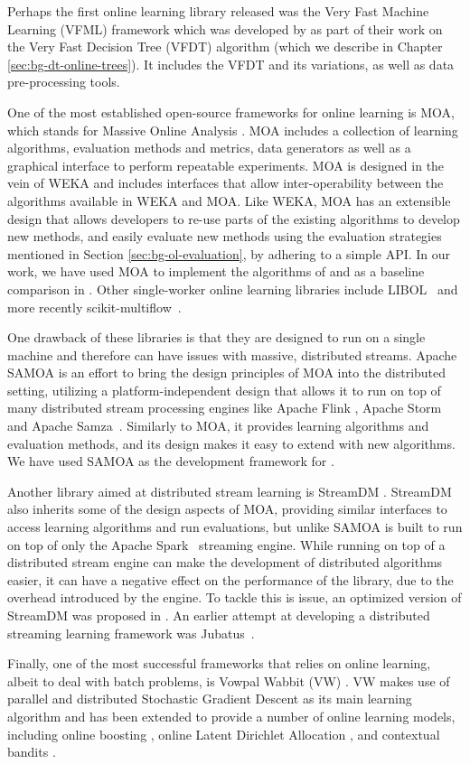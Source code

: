 Perhaps the first online learning library released was the Very Fast Machine Learning (VFML) framework which was developed by \citet{vfdt} as part of their work on the Very Fast Decision Tree (VFDT) algorithm (which we describe in Chapter \ref{sec:bg-dt-online-trees}).
It includes the VFDT and its variations, as well as data pre-processing tools.

One of the most established open-source frameworks for online learning is MOA, which stands
for Massive Online Analysis \cite{bifet2010moa}. MOA includes a collection of
learning algorithms, evaluation methods and metrics, data generators as well as
a graphical interface to perform repeatable experiments. MOA is designed in the
vein of WEKA \cite{weka} and includes interfaces that allow inter-operability
between the algorithms available in WEKA and MOA. Like WEKA, MOA has an extensible
design that allows developers to re-use parts of the existing algorithms to develop
new methods, and easily evaluate new methods using the evaluation strategies mentioned
in Section \ref{sec:bg-ol-evaluation}, by adhering to a simple API. In our work,
we have used MOA to implement the algorithms of \uncertaintrees and as a baseline comparison
in \boostvht. Other single-worker online learning libraries
include LIBOL~\cite{libol} and more recently scikit-multiflow~\cite{sk-multiflow}.

One drawback of these libraries is that they are designed to run on a single machine and therefore
can have issues with massive, distributed streams. Apache SAMOA \cite{samoa} is an effort
to bring the design principles of MOA into the distributed setting, utilizing a platform-independent
design that allows it to run on top of many distributed stream processing engines like
Apache Flink \cite{flink}, Apache Storm~\cite{storm} and Apache Samza~\cite{samza}.
Similarly to MOA, it provides learning algorithms and evaluation methods, and its
design makes it easy to extend with new algorithms.
We have used SAMOA as the development framework for \boostvht.

Another library aimed at distributed stream learning is StreamDM \cite{streamdm}.
StreamDM also inherits some of the design aspects of MOA, providing similar interfaces
to access learning algorithms and run evaluations, but unlike SAMOA
is built to run on top of only the Apache Spark~\cite{spark} streaming engine.
While running on top of a distributed stream engine can make the development
of distributed algorithms easier, it can have a negative effect on the
performance of the library, due to the overhead introduced by the
engine. To tackle this is issue, an optimized version of StreamDM
was proposed in \cite{streamdmPP}. An earlier attempt at developing
a distributed streaming learning framework was Jubatus~\cite{jubatus}.

Finally, one of the most successful frameworks that relies on online learning,
albeit to deal with batch problems, is Vowpal Wabbit (VW) \cite{vw}. VW makes
use of parallel and distributed Stochastic Gradient Descent \cite{sgd} as its main
learning algorithm and has been extended to provide a number of online learning models,
including online boosting \cite{Beygelzimer2015optimal}, online Latent Dirichlet Allocation
\cite{ldaOnline}, and contextual bandits \cite{onlineBandits}.
